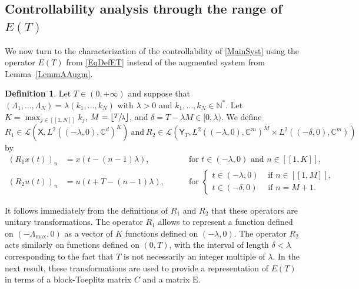 \documentclass[10pt]{amsart}
\newcommand{\llbracket}{[\![}
\newcommand{\rrbracket}{]\!]}
\theoremstyle{plain}
\theoremstyle{definition}
\newtheorem{defi}[theo]{Definition}
\newcommand{\floor}[1]{\left\lfloor #1 \right\rfloor}
\newcommand{\Epsilon}{\mathrm E}
\begin{document}
\subsection{\texorpdfstring{Controllability analysis through the range of $E(T)$}{Controllability analysis through the range of E(T)}}

We now turn to the characterization of the controllability of \eqref{MainSyst} using the operator $E(T)$ from \eqref{EqDefET} instead of the augmented system from Lemma~\ref{LemmAAugm}.

\begin{defi}
\label{DefiR1R2}
Let $T \in (0, +\infty)$ and suppose that $(\Lambda_1, \dots, \Lambda_N) = \lambda (k_1, \dots, k_N)$ with $\lambda > 0$ and $k_1, \dots, k_N \in \mathbb N^\ast$. Let $K = \max_{j \in \llbracket 1, N\rrbracket} k_j$, $M = \floor{\sfrac{T}{\lambda}}$, and $\delta = T - \lambda M \in [0, \lambda)$. We define
\[
R_1 \in \mathcal L\left(\mathsf X, L^2((-\lambda, 0), \mathbb C^d)^K\right)\ \text{and}\ R_2 \in \mathcal L\left(\mathsf Y_T, L^2((-\lambda, 0), \mathbb C^m)^M \times L^2((-\delta, 0), \mathbb C^m)\right)
\]
by\vspace*{-3pt}
\[
\begin{aligned}
(R_1 x(t))_n & = x(t - (n-1)\lambda), & \quad & \text{ for } t \in (-\lambda, 0) \text{ and } n \in \llbracket 1, K\rrbracket, \\
(R_2 u(t))_n & = u(t + T - (n-1)\lambda), & & \text{ for } \left\{
\begin{aligned}
t \in (-\lambda, 0) & \text{ if } n \in \llbracket 1, M\rrbracket, \\
t \in (-\delta, 0) & \text{ if } n = M+1.
\end{aligned}\right.
\end{aligned}
\]
\end{defi}

It follows immediately from the definitions of $R_1$ and $R_2$ that these operators are unitary transformations. The operator $R_1$ allows to represent a function defined on $(-\Lambda_{\max}, 0)$ as a vector of $K$ functions defined on $(-\lambda, 0)$. The operator $R_2$ acts similarly on functions defined on $(0, T)$, with the interval of length $\delta < \lambda$ corresponding to the fact that $T$ is not necessarily an integer multiple of $\lambda$. In the next result, these transformations are used to provide a representation of $E(T)$ in terms of a block-Toeplitz matrix $C$ and a matrix $\Epsilon$.
\end{document}
